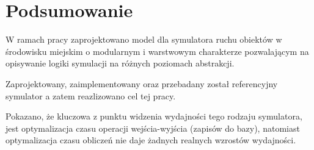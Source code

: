 \chapter{Podsumowanie}
\par{
W ramach pracy zaprojektowano model dla symulatora ruchu obiektów w środowisku miejskim o modularnym i warstwowym charakterze pozwalającym na opisywanie logiki symulacji na różnych poziomach abstrakcji.
}
\par{
Zaprojektowany, zaimplementowany oraz przebadany został referencyjny symulator a zatem reazlizowano cel tej pracy.
}
\par{
Pokazano, że kluczowa z punktu widzenia wydajności tego rodzaju symulatora, jest optymalizacja czasu operacji wejścia-wyjścia (zapisów do bazy), natomiast optymalizacja czasu obliczeń nie daje żadnych realnych wzrostów wydajności.
}